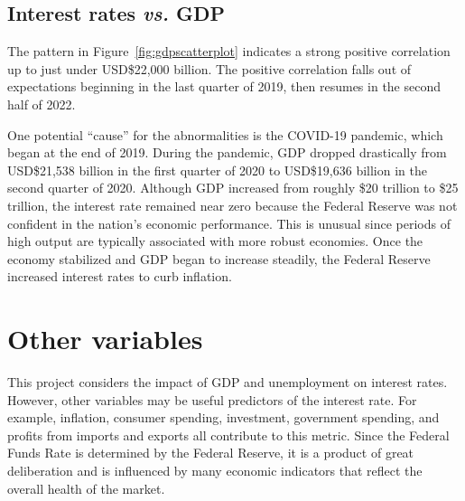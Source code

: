 \documentclass[12pt]{article}
\begin{document}
\subsection{Interest rates \emph{vs.} GDP}
The pattern in Figure~\ref{fig:gdpscatterplot} indicates a strong positive correlation up to just under USD\$22,000 billion. The positive correlation falls out of expectations beginning in the last quarter of 2019, then resumes in the second half of 2022.

One potential ``cause'' for the abnormalities is the COVID-19 pandemic, which began at the end of 2019. During the pandemic, GDP dropped drastically from USD\$21,538 billion in the first quarter of 2020 to USD\$19,636 billion in the second quarter of 2020. Although GDP increased from roughly \$20 trillion to \$25 trillion, the interest rate remained near zero because the Federal Reserve was not confident in the nation's economic performance. This is unusual since periods of high output are typically associated with more robust economies. Once the economy stabilized and GDP began to increase steadily, the Federal Reserve increased interest rates to curb inflation. 
\section{Other variables}
This project considers the impact of GDP and unemployment on interest rates. However, other variables may be useful predictors of the interest rate. For example, inflation, consumer spending, investment, government spending, and profits from imports and exports all contribute to this metric. Since the Federal Funds Rate is determined by the Federal Reserve, it is a product of great deliberation and is influenced by many economic indicators that reflect the overall health of the market.
\end{document}
